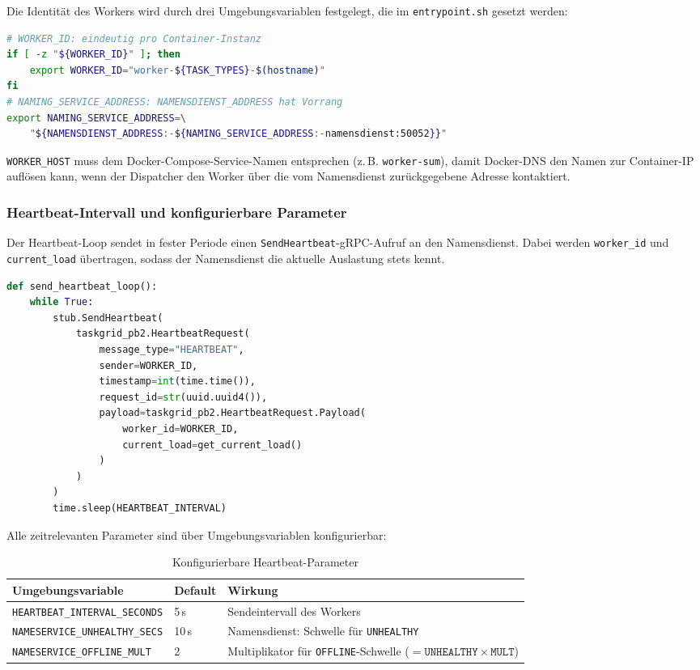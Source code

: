 \noindent Die Identität des Workers wird durch drei Umgebungsvariablen
festgelegt, die im \texttt{entrypoint.sh} gesetzt werden:

\begin{lstlisting}[language=bash,caption={Worker-Identität (entrypoint.sh)}]
# WORKER_ID: eindeutig pro Container-Instanz
if [ -z "${WORKER_ID}" ]; then
    export WORKER_ID="worker-${TASK_TYPES}-$(hostname)"
fi
# NAMING_SERVICE_ADDRESS: NAMENSDIENST_ADDRESS hat Vorrang
export NAMING_SERVICE_ADDRESS=\
    "${NAMENSDIENST_ADDRESS:-${NAMING_SERVICE_ADDRESS:-namensdienst:50052}}"
\end{lstlisting}

\noindent \texttt{WORKER\_HOST} muss dem Docker-Compose-Service-Namen entsprechen
(z.\,B. \texttt{worker-sum}), damit Docker-DNS den Namen zur Container-IP
auflösen kann, wenn der Dispatcher den Worker über die vom Namensdienst
zurückgegebene Adresse kontaktiert.

\subsubsection*{Heartbeat-Intervall und konfigurierbare Parameter}

Der Heartbeat-Loop sendet in fester Periode einen
\texttt{SendHeartbeat}-gRPC-Aufruf an den Namensdienst.
Dabei werden \texttt{worker\_id} und \texttt{current\_load}
übertragen, sodass der Namensdienst die aktuelle Auslastung stets kennt.

\begin{lstlisting}[language=Python,caption={Heartbeat-Loop (worker.py)}]
def send_heartbeat_loop():
    while True:
        stub.SendHeartbeat(
            taskgrid_pb2.HeartbeatRequest(
                message_type="HEARTBEAT",
                sender=WORKER_ID,
                timestamp=int(time.time()),
                request_id=str(uuid.uuid4()),
                payload=taskgrid_pb2.HeartbeatRequest.Payload(
                    worker_id=WORKER_ID,
                    current_load=get_current_load()
                )
            )
        )
        time.sleep(HEARTBEAT_INTERVAL)
\end{lstlisting}

\noindent Alle zeitrelevanten Parameter sind über Umgebungsvariablen konfigurierbar:

\begin{table}[H]
\centering
\begin{tabular}{m{6.5cm} m{2cm} m{5cm}}
\toprule
\textbf{Umgebungsvariable} & \textbf{Default} & \textbf{Wirkung} \\
\midrule
\texttt{HEARTBEAT\_INTERVAL\_SECONDS}
  & 5\,s
  & Sendeintervall des Workers \\
\texttt{NAMESERVICE\_UNHEALTHY\_SECS}
  & 10\,s
  & Namensdienst: Schwelle für \texttt{UNHEALTHY} \\
\texttt{NAMESERVICE\_OFFLINE\_MULT}
  & 2
  & Multiplikator für \texttt{OFFLINE}-Schwelle
    ($= \texttt{UNHEALTHY} \times \texttt{MULT}$) \\
\bottomrule
\end{tabular}
\caption{Konfigurierbare Heartbeat-Parameter}
\end{table}

